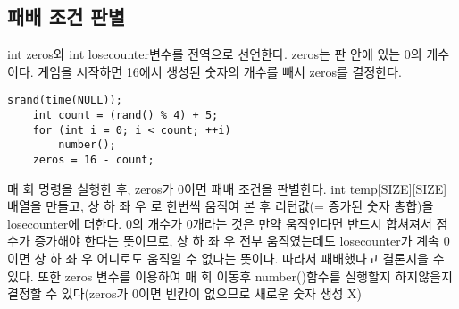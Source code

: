 \documentclass[a4paper]{article}
\begin{document}
        \subsection{패배 조건 판별}
        int zeros와 int losecounter변수를 전역으로 선언한다. zeros는 판 안에 있는 0의 개수이다. 게임을 시작하면 
        16에서 생성된 숫자의 개수를 빼서 zeros를 결정한다.
        \begin{lstlisting}[style=CStyle]
	srand(time(NULL));
	int count = (rand() % 4) + 5;
	for (int i = 0; i < count; ++i) 
		number();
    zeros = 16 - count;
        \end{lstlisting} 
        매 회 명령을 실행한 후, zeros가 0이면 패배 조건을 판별한다.
        int temp[SIZE][SIZE]배열을 만들고, 상 하 좌 우 로 한번씩 움직여 본 후 리턴값(= 증가된 숫자 총합)을 losecounter에 더한다.
        0의 개수가 0개라는 것은 만약 움직인다면 반드시 합쳐져서 점수가 증가해야 한다는 뜻이므로, 상 하 좌 우 전부 움직였는데도 losecounter가 계속 0이면
        상 하 좌 우 어디로도 움직일 수 없다는 뜻이다. 따라서 패배했다고 결론지을 수 있다.
        또한 zeros 변수를 이용하여 매 회 이동후 number()함수를 실행할지 하지않을지 결정할 수 있다(zeros가 0이면 빈칸이 없으므로 새로운 숫자 생성 X)
\end{document}
